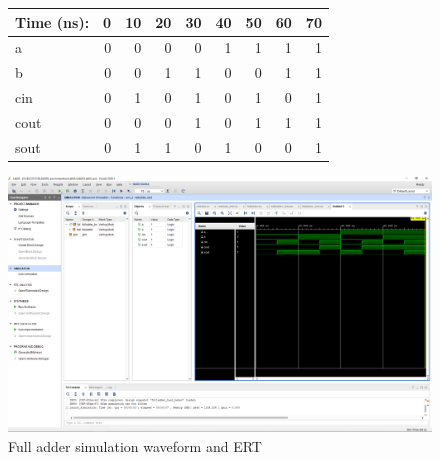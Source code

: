 \documentclass[11pt]{article}
\begin{document}
\begin{figure}[ht]\centering
	\begin{tabular}{l|rrrrrrrr}
		Time (ns): & 0 & 10 & 20 & 30 & 40 & 50 & 60 & 70 \\
		\midrule
		a & 0 & 0 & 0 & 0 & 1 & 1 & 1 & 1 \\
		b & 0 & 0 & 1 & 1 & 0 & 0 & 1 & 1 \\
		cin & 0 & 1 & 0 & 1 & 0 & 1 & 0 & 1 \\
		\midrule
		cout & 0 & 0 & 0 & 1 & 0 & 1 & 1 & 1 \\
		sout & 0 & 1 & 1 & 0 & 1 & 0 & 0 & 1 \\
		\bottomrule
	\end{tabular}\medskip
	
	\includegraphics[width=1\textwidth,trim=19cm 15cm 0.5cm 4.5cm,clip]{lab05_fulladder_screenshot}
	\caption{Full adder simulation waveform and ERT}
	\label{fig:sim_with_table}
\end{figure}
\end{document}

